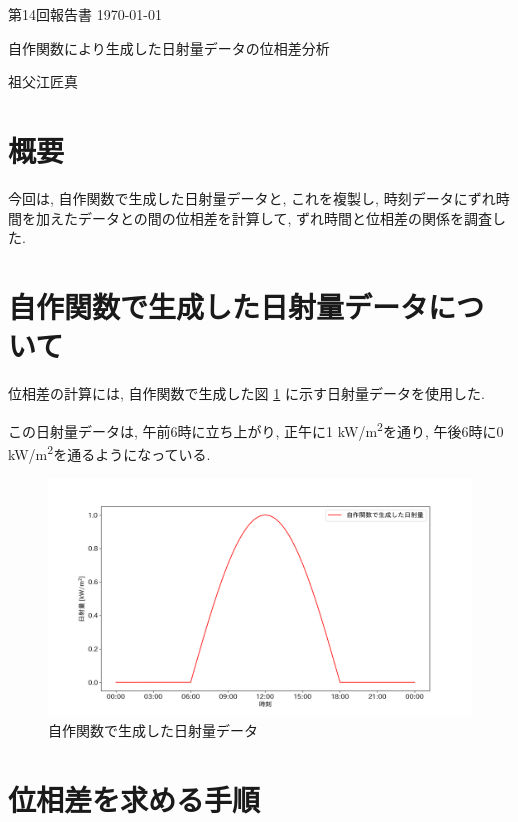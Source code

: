 \documentclass[a4j,12pt,]{jarticle}
\begin{document}
{\noindent\small 第14回報告書 \hfill\today}
\begin{center}
  {\Large 自作関数により生成した日射量データの位相差分析}
\end{center}
\begin{flushright}
  祖父江匠真 \\
\end{flushright}

\section{概要}
今回は, 自作関数で生成した日射量データと, これを複製し, 時刻データにずれ時間を加えたデータとの間の位相差を計算して, ずれ時間と位相差の関係を調査した.

\section{自作関数で生成した日射量データについて}
位相差の計算には, 自作関数で生成した図 \ref{p1} に示す日射量データを使用した.

この日射量データは, 午前6時に立ち上がり, 正午に1 \si{\kilo\watt/m^2}を通り, 午後6時に0 \si{\kilo\watt/m^2}を通るようになっている.

\begin{figure}[H]
  \begin{center}
    \includegraphics[width=160mm]{simulated.png}
    \caption{自作関数で生成した日射量データ}
    \label{p1}
  \end{center}
\end{figure}

\section{位相差を求める手順}
\end{document}

